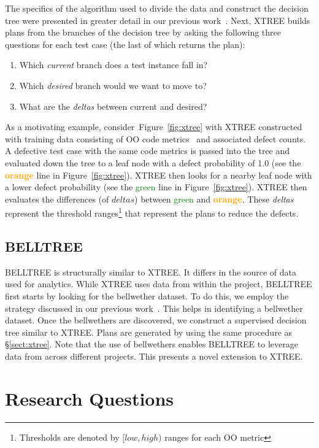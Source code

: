 \documentclass[conference]{IEEEtran}
\newcommand{\be}{\begin{enumerate}}
\newcommand{\ee}{\end{enumerate}}
\newcommand{\tion}[1]{\S\ref{sect:#1}}
\newcommand{\fig}[1]{Figure~\ref{fig:#1}}
\theoremstyle{break}
\begin{document}
The specifics of the algorithm used to divide the data and construct the decision tree were presented in greater detail in our previous work~\cite{krishna17a}.
Next, XTREE builds plans from the branches of the decision tree by asking the following three questions for each test case (the last of which returns the plan):
\be
\item
Which {\em current} branch does a test instance fall in?
\item Which {\em desired} branch would we want to move to?
\item What are the {\em deltas} between current and desired? 
\ee

As a motivating example, consider~\fig{xtree} with XTREE constructed with training data consisting of OO code metrics~\cite{ck} and associated defect counts. 
A defective test case with the same code metrics is passed into the 
tree and evaluated down the tree to a leaf node with a defect probability of 1.0 (see the \textcolor{orange}{{\bf orange}} line in \fig{xtree}).
XTREE then looks for a nearby leaf node with a lower defect
probability (see the \textcolor{green}{{green}} line in \fig{xtree}). XTREE then evaluates the differences (of $deltas$) between
\textcolor{green}{{green}} and \textcolor{orange}{{\bf orange}}.
These \textit{deltas} represent the threshold ranges\footnote{Thresholds are denoted by $[low,high)$ ranges for each OO metric} that represent the plans to reduce the defects. 




\subsection{BELLTREE}
BELLTREE is structurally similar to XTREE. It differs in the source of data used for analytics. While XTREE uses data from within the project, BELLTREE first starts by looking for the bellwether dataset. To do this, we employ the strategy discussed in our previous work~\cite{krishna16}. This helps in identifying a bellwether dataset. Once the bellwethers are discovered, we construct a supervised decision tree similar to XTREE. Plans are generated by using the same procedure as \tion{xtree}. Note that the use of bellwethers enables BELLTREE to leverage data from across different projects. This presents a novel extension to XTREE.

\section{Research Questions}
\end{document}
